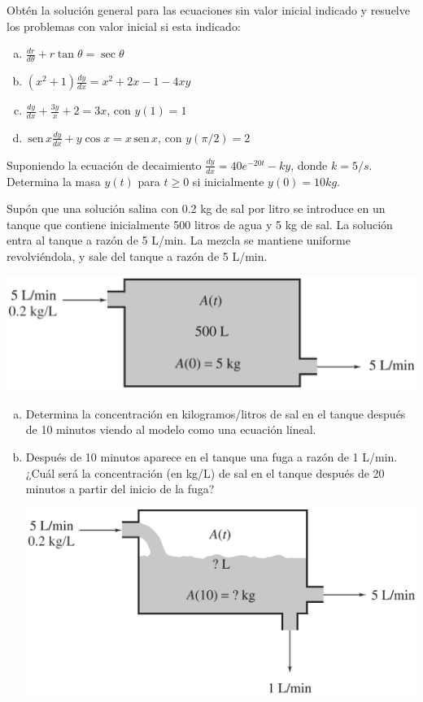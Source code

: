 \documentclass[12pt]{exam}
\renewcommand{\sin}{\,\text{sen}\,}
\begin{document}
\begin{questions}
     \question
     Obtén la solución general para las ecuaciones sin valor inicial indicado y resuelve los problemas con valor inicial si esta indicado:
     \begin{enumerate}[a)]
     \item	$\frac{dr}{d\theta}+r\tan\theta=\sec\theta$
     \item	$(x^2+1)\frac{dy}{dx}=x^2+2x-1-4xy$
     \item	$\frac{dy}{dx}+\frac{3y}{x}+2=3x$, con $y(1)=1$
     \item	$\sin x\frac{dy}{dx}+y\cos x=x\sin x$, con $y(\pi/2)=2$
     \end{enumerate}

     \question
     Suponiendo la ecuación de decaimiento $\frac{dy}{dx}=40e^{-20t}-ky$, donde $k=5/s$. Determina la masa $y(t)$ para $t\geq0$ si inicialmente $y(0)=10kg$.

     \question
     Supón que una solución salina con 0.2 kg de sal por litro se introduce en un tanque que contiene inicialmente 500 litros de agua y 5 kg de sal. La solución entra al tanque a razón de 5 L/min. La mezcla se mantiene uniforme revolviéndola, y sale del tanque a razón de 5 L/min.

\includegraphics[scale=.34]{F2T2.pdf}

\begin{enumerate}[a)]
	\item	Determina la concentración en kilogramos/litros de sal en el tanque después de 10 minutos viendo al modelo como una ecuación lineal.
    \item Después de 10 minutos aparece en el tanque una fuga a razón de 1 L/min. ¿Cuál será la concentración (en kg/L) de sal en el tanque después de 20 minutos a partir del inicio de la fuga?
    
    \includegraphics[scale=.34]{F3T2.pdf}
    

\end{enumerate}
\end{questions}
\end{document}
